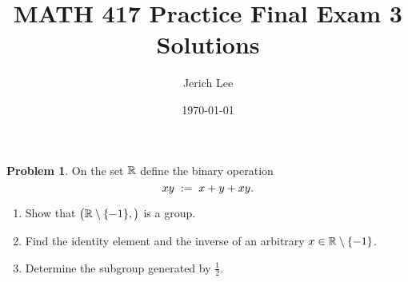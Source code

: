 \documentclass[12pt]{article}
\title{MATH 417 Practice Final Exam 3 Solutions}
\author{Jerich Lee}
\date{\today}
\theoremstyle{definition} %
\newtheorem{problem}{Problem}
\theoremstyle{plain} %
\begin{document}
\maketitle
\begin{problem}
  On the set \(\Bbb R\) define the binary operation
  \[
     x\*y \;:=\; x+y+xy .
  \]
  \begin{enumerate}[]
     \item Show that \(\bigl(\Bbb R\setminus\{-1\},\*\bigr)\) is a group.
     \item Find the identity element and the inverse of an arbitrary
           \(x\in\Bbb R\setminus\{-1\}\).
     \item Determine the subgroup generated by \(\tfrac12\).
  \end{enumerate}
  \end{problem}
  
\end{document}
